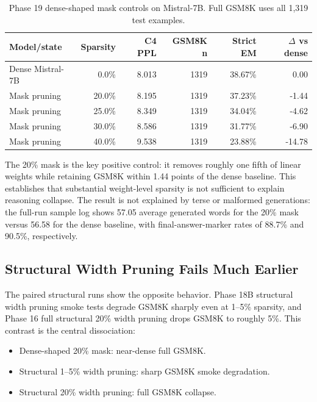 \documentclass{article}
\begin{document}
\begin{table}[h]
\centering
\caption{Phase 19 dense-shaped mask controls on Mistral-7B. Full GSM8K uses all 1,319 test examples.}
\label{tab:phase19_mask}
\begin{tabular}{lrrrrr}
\toprule
\textbf{Model/state} & \textbf{Sparsity} & \textbf{C4 PPL} & \textbf{GSM8K n} & \textbf{Strict EM} & \textbf{$\Delta$ vs dense} \\
\midrule
Dense Mistral-7B & 0.0\% & 8.013 & 1319 & 38.67\% & 0.00 \\
Mask pruning & 20.0\% & 8.195 & 1319 & 37.23\% & -1.44 \\
Mask pruning & 25.0\% & 8.349 & 1319 & 34.04\% & -4.62 \\
Mask pruning & 30.0\% & 8.586 & 1319 & 31.77\% & -6.90 \\
Mask pruning & 40.0\% & 9.538 & 1319 & 23.88\% & -14.78 \\
\bottomrule
\end{tabular}
\end{table}

The 20\% mask is the key positive control: it removes roughly one fifth of linear weights while retaining GSM8K within 1.44 points of the dense baseline. This establishes that substantial weight-level sparsity is not sufficient to explain reasoning collapse. The result is not explained by terse or malformed generations: the full-run sample log shows 57.05 average generated words for the 20\% mask versus 56.58 for the dense baseline, with final-answer-marker rates of 88.7\% and 90.5\%, respectively.

\subsection{Structural Width Pruning Fails Much Earlier}

The paired structural runs show the opposite behavior. Phase 18B structural width pruning smoke tests degrade GSM8K sharply even at 1--5\% sparsity, and Phase 16 full structural 20\% width pruning drops GSM8K to roughly 5\%. This contrast is the central dissociation:

\begin{itemize}
    \item Dense-shaped 20\% mask: near-dense full GSM8K.
    \item Structural 1--5\% width pruning: sharp GSM8K smoke degradation.
    \item Structural 20\% width pruning: full GSM8K collapse.
\end{itemize}
\end{document}
